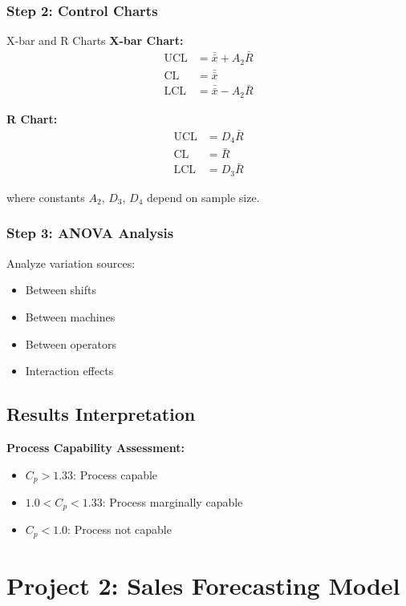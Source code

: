 \documentclass[12pt,a4paper]{book}
\begin{document}
{{\subsubsection{Step 2: Control Charts}

\begin{definition}{X-bar and R Charts}
\textbf{X-bar Chart:}
\begin{align}
\text{UCL} &= \bar{\bar{x}} + A_2 \bar{R}\\
\text{CL} &= \bar{\bar{x}}\\
\text{LCL} &= \bar{\bar{x}} - A_2 \bar{R}
\end{align}

\textbf{R Chart:}
\begin{align}
\text{UCL} &= D_4 \bar{R}\\
\text{CL} &= \bar{R}\\
\text{LCL} &= D_3 \bar{R}
\end{align}

where constants $A_2$, $D_3$, $D_4$ depend on sample size.
\end{definition}

\subsubsection{Step 3: ANOVA Analysis}

Analyze variation sources:
\begin{itemize}
    \item Between shifts
    \item Between machines
    \item Between operators
    \item Interaction effects
\end{itemize}

\subsection{Results Interpretation}

\textbf{Process Capability Assessment:}
\begin{itemize}
    \item $C_p > 1.33$: Process capable
    \item $1.0 < C_p < 1.33$: Process marginally capable
    \item $C_p < 1.0$: Process not capable
\end{itemize}

\section{Project 2: Sales Forecasting Model}

}}
\end{document}
